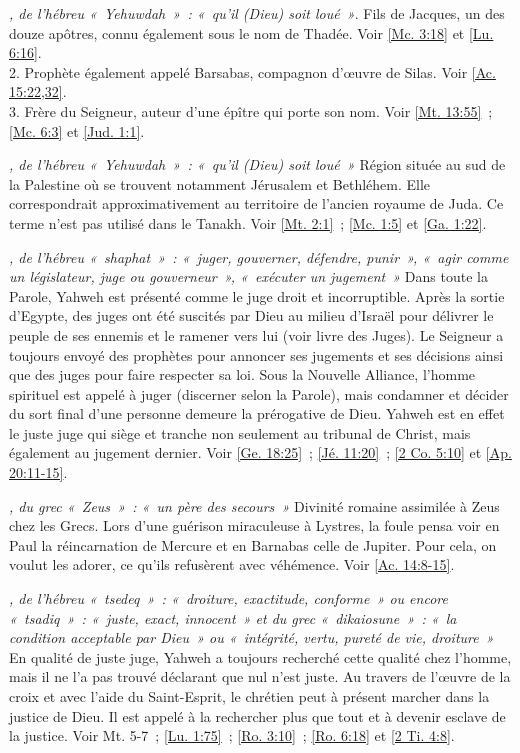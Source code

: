 \begin{multicols}{2}
\textit{, de l'hébreu «~Yehuwdah~»~: «~qu'il (Dieu) soit loué~»}. Fils de Jacques, un des douze apôtres, connu également sous le nom de Thadée. Voir \vref{Mc. 3:18} et \vref{Lu. 6:16}.
\\2. Prophète également appelé Barsabas, compagnon d'œuvre de Silas. Voir \vref{Ac. 15:22,32}.
\\3. Frère du Seigneur, auteur d'une épître qui porte son nom. Voir \vref{Mt. 13:55}~; \vref{Mc. 6:3} et \vref{Jud. 1:1}.

\textit{, de l'hébreu «~Yehuwdah~»~: «~qu'il (Dieu) soit loué~»}\newline
Région située au sud de la Palestine où se trouvent notamment Jérusalem et Bethléhem. Elle correspondrait approximativement au territoire de l'ancien royaume de Juda. Ce terme n'est pas utilisé dans le Tanakh. Voir \vref{Mt. 2:1}~; \vref{Mc. 1:5} et \vref{Ga. 1:22}.

\textit{, de l'hébreu «~shaphat~»~: «~juger, gouverner, défendre, punir~», «~agir comme un législateur, juge ou gouverneur~», «~exécuter un jugement~»}\newline
Dans toute la Parole, Yahweh est présenté comme le juge droit et incorruptible. Après la sortie d'Egypte, des juges ont été suscités par Dieu au milieu d'Israël pour délivrer le peuple de ses ennemis et le ramener vers lui (voir livre des Juges). Le Seigneur a toujours envoyé des prophètes pour annoncer ses jugements et ses décisions ainsi que des juges pour faire respecter sa loi. Sous la Nouvelle Alliance, l'homme spirituel est appelé à juger (discerner selon la Parole), mais condamner et décider du sort final d'une personne demeure la prérogative de Dieu. Yahweh est en effet le juste juge qui siège et tranche non seulement au tribunal de Christ, mais également au jugement dernier. Voir \vref{Ge. 18:25}~; \vref{Jé. 11:20}~; \vref{2 Co. 5:10} et \vref{Ap. 20:11-15}.

\textit{, du grec «~Zeus~»~: «~un père des secours~»}\newline
Divinité romaine assimilée à Zeus chez les Grecs. Lors d'une guérison miraculeuse à Lystres, la foule pensa voir en Paul la réincarnation de Mercure et en Barnabas celle de Jupiter. Pour cela, on voulut les adorer, ce qu'ils refusèrent avec véhémence. Voir \vref{Ac. 14:8-15}.

\textit{, de l'hébreu «~tsedeq~»~: «~droiture, exactitude, conforme~» ou encore «~tsadiq~»~: «~juste, exact, innocent~» et du grec «~dikaiosune~»~: «~la condition acceptable par Dieu~» ou «~intégrité, vertu, pureté de vie, droiture~»}\newline
En qualité de juste juge, Yahweh a toujours recherché cette qualité chez l'homme, mais il ne l'a pas trouvé déclarant que nul n'est juste. Au travers de l'œuvre de la croix et avec l'aide du Saint-Esprit, le chrétien peut à présent marcher dans la justice de Dieu. Il est appelé à la rechercher plus que tout et à devenir esclave de la justice. Voir Mt. 5-7~; \vref{Lu. 1:75}~; \vref{Ro. 3:10}~; \vref{Ro. 6:18} et \vref{2 Ti. 4:8}.


\end{multicols}
